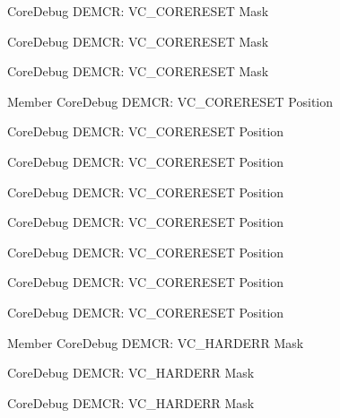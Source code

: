 \begin{DoxyRefList}
\label{deprecated__deprecated000356}%
%
Core\+Debug DEMCR\+: VC\+\_\+\+CORERESET Mask 

\label{deprecated__deprecated000432}%
%
Core\+Debug DEMCR\+: VC\+\_\+\+CORERESET Mask 

\label{deprecated__deprecated000214}%
%
Core\+Debug DEMCR\+: VC\+\_\+\+CORERESET Mask  
\item[Member \doxylink{group__CMSIS__CoreDebug_ga9fcf09666f7063a7303117aa32a85d5a}{Core\+Debug\+\_\+\+DEMCR\+\_\+\+VC\+\_\+\+CORERESET\+\_\+\+Pos} ]\label{deprecated__deprecated000622}%
%
Core\+Debug DEMCR\+: VC\+\_\+\+CORERESET Position 

\label{deprecated__deprecated000069}%
%
Core\+Debug DEMCR\+: VC\+\_\+\+CORERESET Position 

\label{deprecated__deprecated000355}%
%
Core\+Debug DEMCR\+: VC\+\_\+\+CORERESET Position 

\label{deprecated__deprecated000213}%
%
Core\+Debug DEMCR\+: VC\+\_\+\+CORERESET Position 

\label{deprecated__deprecated000431}%
%
Core\+Debug DEMCR\+: VC\+\_\+\+CORERESET Position 

\label{deprecated__deprecated000137}%
%
Core\+Debug DEMCR\+: VC\+\_\+\+CORERESET Position 

\label{deprecated__deprecated000520}%
%
Core\+Debug DEMCR\+: VC\+\_\+\+CORERESET Position 

\label{deprecated__deprecated000276}%
%
Core\+Debug DEMCR\+: VC\+\_\+\+CORERESET Position  
\item[Member \doxylink{group__CMSIS__CoreDebug_ga803fc98c5bb85f10f0347b23794847d1}{Core\+Debug\+\_\+\+DEMCR\+\_\+\+VC\+\_\+\+HARDERR\+\_\+\+Msk} ]\label{deprecated__deprecated000275}%
%
Core\+Debug DEMCR\+: VC\+\_\+\+HARDERR Mask 

\label{deprecated__deprecated000342}%
%
Core\+Debug DEMCR\+: VC\+\_\+\+HARDERR Mask 

\label{deprecated__deprecated000418}%
%
Core\+Debug DEMCR\+: VC\+\_\+\+HARDERR Mask 


\end{DoxyRefList}
